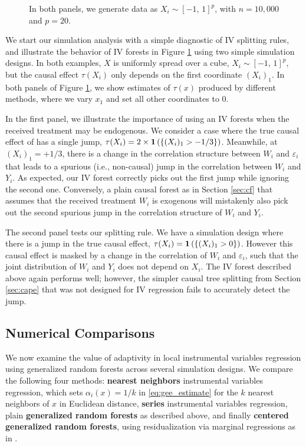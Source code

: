 \documentclass[aos]{imsart}
\theoremstyle{plain}
\theoremstyle{definition}
\theoremstyle{remark}
\begin{document}
\begin{CJK}{UTF8}{gbsn}
\begin{appendix}
\begin{figure}
\begin{tabular}{cc}
\end{tabular}
\caption{In both panels, we generate data as $X_i \sim [-1, \, 1]^p$, with $n = 10,000$ and $p = 20$.}
\label{fig:iv_simu}
\end{figure}

We start our simulation analysis with a simple diagnostic of IV splitting rules, and
illustrate the behavior of IV forests in Figure \ref{fig:iv_simu} using two simple simulation designs.
In both examples, $X$ is uniformly spread over a cube, $X_i \sim [-1, \, 1]^p$, but the causal effect
$\tau(X_i)$ only depends on the first coordinate $(X_i)_1$. In both panels of Figure \ref{fig:iv_simu},
we show estimates of $\tau(x)$ produced by different methods, where we vary $x_1$ and set all
other coordinates to 0.

In the first panel, we illustrate the importance of using an IV forests when the received treatment
may be endogenous. We consider a case where the true causal effect of has a single jump,
$\tau(X_i) = 2 \times \mathbf{1}\left(\left\{(X_i)_1 > -1/3\right\}\right)$. Meanwhile, at $(X_i)_1 = +1/3$, there is a change
in the correlation structure between $W_i$ and $\varepsilon_i$ that leads to a spurious
(i.e., non-causal) jump in the correlation between $W_i$ and $Y_i$. As expected, our IV forest
correctly picks out the first jump while ignoring the second one. Conversely, a plain causal forest
as in Section \ref{sec:cf} that assumes that the received treatment $W_i$ is
exogenous will mistakenly also pick out the second spurious jump in the correlation structure
of $W_i$ and $Y_i$.

The second panel tests our splitting rule. We have a simulation design where there
is a jump in the true causal effect, $\tau(X_i) = \mathbf{1}\left(\left\{(X_i)_1 > 0\right\}\right)$. However this causal effect is
masked by a change in the correlation of $W_i$ and $\varepsilon_i$, such that the joint distribution
of $W_i$ and $Y_i$ does not depend on $X_i$. The IV forest described above
again performs well; however, the simpler causal tree splitting from
Section \ref{sec:cape} that was not designed for IV regression
fails to accurately detect the jump.

\subsection{Numerical Comparisons}
\label{sec:bigsimu}

We now examine the value of adaptivity in local instrumental variables regression using generalized random forests
across several simulation designs. We compare the following four methods:
{\bf nearest neighbors} instrumental variables regression, which sets $\alpha_i(x) = 1/k$ in
\eqref{eq:gee_estimate} for the $k$ nearest neighbors of $x$ in Euclidean distance,
{\bf series} instrumental variables regression, 
plain {\bf generalized random forests} as described above, and finally
{\bf centered generalized random forests}, using residualization via marginal regressions as in \citet{robinson1988root}.


\end{appendix}
\end{CJK}
\end{document}
